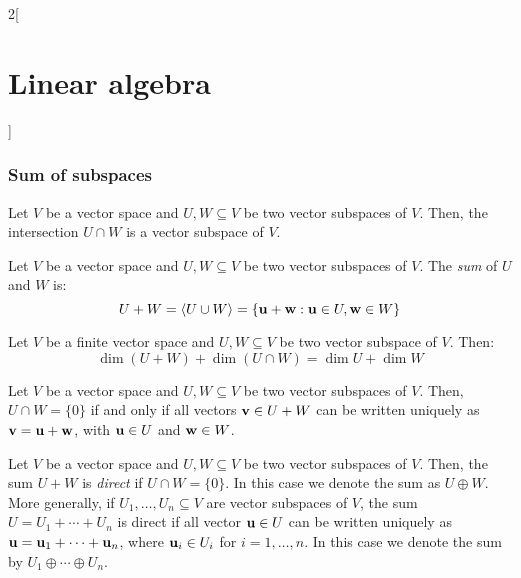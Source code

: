 \documentclass[../../../main.tex]{subfiles}
\begin{document}
\begin{multicols}{2}[\section{Linear algebra}]
  \subsubsection{Sum of subspaces}
  \begin{lemma}
    Let $V$ be a vector space and $U,W\subseteq V$ be two vector subspaces of $V$. Then, the intersection $U\cap W$ is a vector subspace of $V$.
  \end{lemma}
  \begin{definition}
    Let $V$ be a vector space and $U,W\subseteq V$ be two vector subspaces of $V$. The \emph{sum} of $U$ and $W$ is: $$U+W=\langle U\cup W\rangle=\{\boldsymbol{\mathrm{u}}+\boldsymbol{\mathrm{w}}: \boldsymbol{\mathrm{u}}\in U,\boldsymbol{\mathrm{w}}\in W\}$$
  \end{definition}
  \begin{prop}
    Let $V$ be a finite vector space and $U,W\subseteq V$ be two vector subspace of $V$. Then: $$\dim (U+W)+\dim(U\cap W)=\dim U+\dim W$$
  \end{prop}
  \begin{lemma}
    Let $V$ be a vector space and $U,W\subseteq V$ be two vector subspaces of $V$. Then, $U\cap W=\{0\}$ if and only if all vectors $\boldsymbol{\mathrm{v}}\in U+W$ can be written uniquely as $\boldsymbol{\mathrm{v}}=\boldsymbol{\mathrm{u}}+\boldsymbol{\mathrm{w}}$, with $\boldsymbol{\mathrm{u}}\in U$ and $\boldsymbol{\mathrm{w}}\in W$.
  \end{lemma}
  \begin{definition}
    Let $V$ be a vector space and $U,W\subseteq V$ be two vector subspaces of $V$. Then, the sum $U+W$ is \emph{direct} if $U\cap W=\{0\}$. In this case we denote the sum as $U\oplus W$. More generally, if $U_1,\ldots,U_n\subseteq V$ are vector subspaces of $V$, the sum $U=U_1+\cdots+U_n$ is direct if all vector $\boldsymbol{\mathrm{u}}\in U$ can be written uniquely as $\boldsymbol{\mathrm{u}}=\boldsymbol{\mathrm{u}}_1+\cdots+\boldsymbol{\mathrm{u}}_n$, where $\boldsymbol{\mathrm{u}}_i\in U_i$ for $i=1,\ldots,n$. In this case we denote the sum by $U_1\oplus\cdots\oplus U_n$.
  \end{definition}

\end{multicols}
\end{document}
